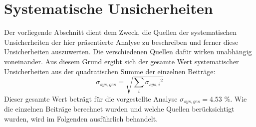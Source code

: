 \documentclass[12pt,a4paper]{report}
\begin{document}
\section{Systematische Unsicherheiten} 
Der vorliegende Abschnitt dient dem Zweck, die Quellen der systematischen Unsicherheiten der hier präsentierte Analyse zu beschreiben und ferner diese Unsicherheiten auszuwerten. Die verschiedenen Quellen dafür wirken unabhängig voneinander. Aus diesem Grund ergibt sich der gesamte Wert systematischer Unsicherheiten aus der quadratischen Summe der einzelnen Beiträge:
\begin{equation}
\sigma_{sys, ges} = \sqrt{\sum_{i}{\sigma_{sys, i}}^2}
\end{equation}
Dieser gesamte Wert beträgt für die vorgestellte Analyse $\sigma_{sys, ges} = 4.53$ \%. Wie die einzelnen Beiträge berechnet wurden und welche Quellen berücksichtigt wurden, wird im Folgenden ausführlich behandelt.
\end{document}
